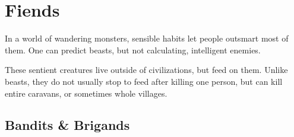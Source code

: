 \chapter{Fiends}

\toggletrue{genExamples}

In a world of wandering monsters, sensible habits let people outsmart most of them.
One can predict beasts, but not calculating, intelligent enemies.

These sentient creatures live outside of civilizations, but feed on them.
Unlike beasts, they do not usually stop to feed after killing one person, but can kill entire caravans, or sometimes whole villages.

\section{Bandits \& Brigands}

